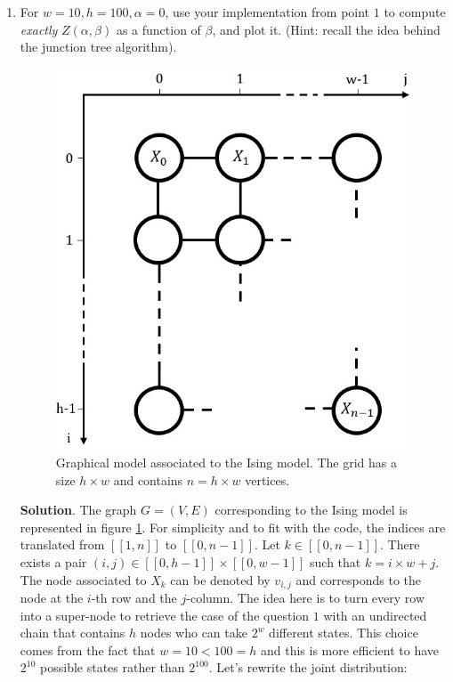 \documentclass[a4paper, 11pt]{report}
\begin{document}
\begin{enumerate}[resume]
    \item For $w = 10, h = 100, \alpha = 0$, use your implementation from point $1$ to compute \emph{exactly} $Z \left( \alpha, \beta \right)$ as a function of $\beta$, and plot it. (Hint: recall the idea behind the junction tree algorithm).
    
    \begin{figure}
        \centering
        \includegraphics[scale=.7]{images/ising_model.jpg}
        \caption{Graphical model associated to the Ising model. The grid has a size $h \times w$ and contains $n = h \times w$ vertices.}
        \label{fig:ising}
    \end{figure}
    
    \textbf{Solution}. The graph $G = \left( V, E \right)$ corresponding to the Ising model is represented in figure \ref{fig:ising}. For simplicity and to fit with the code, the indices are translated from $[\![ 1, n ]\!]$ to $[\![ 0, n-1 ]\!]$. Let $k \in [\![ 0, n-1 ]\!]$. There exists a pair $(i, j) \in [\![ 0, h-1 ]\!] \times [\![ 0, w-1 ]\!]$ such that $k = i \times w + j$. The node associated to $X_k$ can be denoted by $v_{i, j}$ and corresponds to the node at the $i$-th row and the $j$-column. The idea here is to turn every row into a super-node to retrieve the case of the question $1$ with an undirected chain that contains $h$ nodes who can take $2^{w}$ different states. This choice comes from the fact that $w = 10 < 100 = h$ and this is more efficient to have $2^{10}$ possible states rather than $2^{100}$. Let's rewrite the joint distribution:
    

\end{enumerate}
\end{document}
